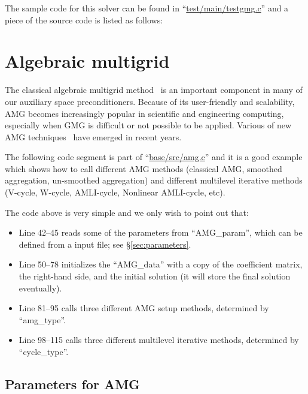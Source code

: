 \documentclass[11pt]{memoir}
\begin{document}
The sample code for this solver can be found in ``\url{test/main/testgmg.c}'' and a piece of the source code is listed as follows:
%

%

\section{Algebraic multigrid}\label{sec:amg}

The classical algebraic multigrid method~\cite{Ruge.RugeStuben.1987bs} is an important component in many of our auxiliary space preconditioners. Because of its user-friendly and scalability, AMG becomes increasingly popular in scientific and engineering computing, especially when GMG is difficult or not possible to be applied. Various of new AMG techniques~\cite{Vanek.VanekMandel.1996kl,Wan.WanChan.2000qa,Brezina.BrezinaCleary.2000ly,Henson.HensonVassilevski.2001cr,Chartier.ChartierFalgout.2003ve,Livne.Livne.2004kl,Falgout.FalgoutVassilevski.2004bh,Xu.XuZikatanov.2004pi,Brannick.BrannickZikatanov.2007zr,Muresan.MuresanNotay.2008tg, Hu.X;Vassilevski.P;Xu.J.2013a} have emerged in recent years.

The following code segment is part of ``\url{base/src/amg.c}'' and it is a good example which shows how to call different AMG methods (classical AMG, smoothed aggregation, un-smoothed aggregation) and different multilevel iterative methods (V-cycle, W-cycle, AMLI-cycle, Nonlinear AMLI-cycle, etc).
%

%
The code above is very simple and we only wish to point out that:
%
\begin{itemize}
\item Line 42--45 reads some of the parameters from ``AMG\_param'', which can be defined from a input file; see \S\ref{sec:parameters}.
\item Line 50--78 initializes the ``AMG\_data'' with a copy of the coefficient matrix, the right-hand side, and the initial solution (it will store the final solution eventually).
\item Line 81--95 calls three different AMG setup methods, determined by ``amg\_type''.
\item Line 98--115 calls three different multilevel iterative methods, determined by ``cycle\_type''.
\end{itemize}

\subsection{Parameters for AMG}
\end{document}
